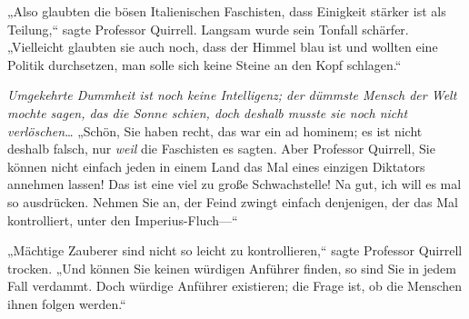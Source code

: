 „Also glaubten die bösen Italienischen Faschisten, dass Einigkeit stärker ist als Teilung,“ sagte Professor Quirrell. Langsam wurde sein Tonfall schärfer. „Vielleicht glaubten sie auch noch, dass der Himmel blau ist und wollten eine Politik durchsetzen, man solle sich keine Steine an den Kopf schlagen.“

\emph{Umgekehrte Dummheit ist noch keine Intelligenz; der dümmste Mensch der Welt mochte sagen, das die Sonne schien, doch deshalb musste sie noch nicht verlöschen}…
„Schön, Sie haben recht, das war ein ad hominem; es ist nicht deshalb falsch, nur \emph{weil} die Faschisten es sagten. Aber Professor Quirrell, Sie können nicht einfach jeden in einem Land das Mal eines einzigen Diktators annehmen lassen! Das ist eine viel zu große Schwachstelle!
Na gut, ich will es mal so ausdrücken. Nehmen Sie an, der Feind zwingt einfach denjenigen, der das Mal kontrolliert, unter den Imperius-Fluch—“

„Mächtige Zauberer sind nicht so leicht zu kontrollieren,“ sagte Professor Quirrell trocken. „Und können Sie keinen würdigen Anführer finden, so sind Sie in jedem Fall verdammt. Doch würdige Anführer existieren; die Frage ist, ob die Menschen ihnen folgen werden.“

